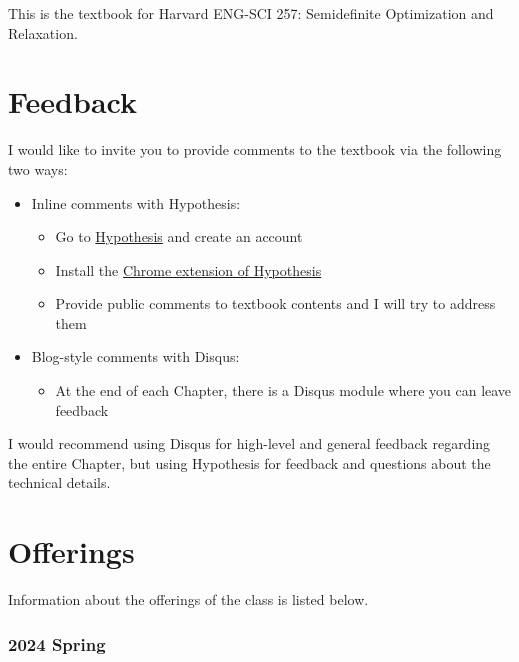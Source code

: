 \documentclass[
]{book}
\providecommand{\tightlist}{%
  \setlength{\itemsep}{0pt}\setlength{\parskip}{0pt}}
\theoremstyle{definition}
\theoremstyle{definition}
\theoremstyle{definition}
\theoremstyle{definition}
\theoremstyle{remark}
\begin{document}
This is the textbook for Harvard ENG-SCI 257: Semidefinite Optimization and Relaxation.

\hypertarget{feedback}{%
\section*{Feedback}\label{feedback}}

I would like to invite you to provide comments to the textbook via the following two ways:

\begin{itemize}
\tightlist
\item
  Inline comments with Hypothesis:

  \begin{itemize}
  \tightlist
  \item
    Go to \href{https://hypothes.is}{Hypothesis} and create an account
  \item
    Install the \href{https://chrome.google.com/webstore/detail/hypothesis-web-pdf-annota/bjfhmglciegochdpefhhlphglcehbmek}{Chrome extension of Hypothesis}
  \item
    Provide public comments to textbook contents and I will try to address them
  \end{itemize}
\item
  Blog-style comments with Disqus:

  \begin{itemize}
  \tightlist
  \item
    At the end of each Chapter, there is a Disqus module where you can leave feedback
  \end{itemize}
\end{itemize}

I would recommend using Disqus for high-level and general feedback regarding the entire Chapter, but using Hypothesis for feedback and questions about the technical details.

\hypertarget{offerings}{%
\section*{Offerings}\label{offerings}}

Information about the offerings of the class is listed below.

\hypertarget{spring}{%
\subsubsection*{2024 Spring}\label{spring}}
\end{document}
